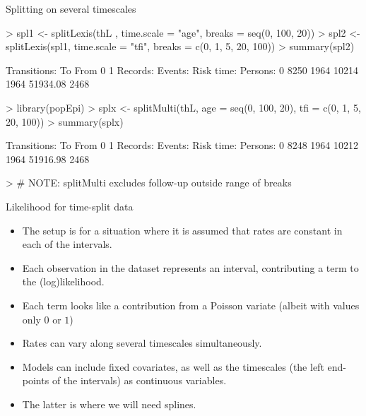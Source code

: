 \begin{frame}[fragile]{Splitting on several timescales}
\vspace*{-1em}
\begin{Schunk}
\begin{Sinput}
> spl1 <- splitLexis(thL , time.scale = "age", breaks = seq(0, 100, 20))
> spl2 <- splitLexis(spl1, time.scale = "tfi", breaks = c(0, 1, 5, 20, 100))
> summary(spl2)
\end{Sinput}
\begin{Soutput}
Transitions:
     To
From    0    1  Records:  Events: Risk time:  Persons:
   0 8250 1964     10214     1964   51934.08      2468
\end{Soutput}
\begin{Sinput}
> library(popEpi)
> splx <- splitMulti(thL, age = seq(0, 100, 20), tfi = c(0, 1, 5, 20, 100))
> summary(splx)
\end{Sinput}
\begin{Soutput}
Transitions:
     To
From    0    1  Records:  Events: Risk time:  Persons:
   0 8248 1964     10212     1964   51916.98      2468
\end{Soutput}
\begin{Sinput}
> # NOTE: splitMulti excludes follow-up outside range of breaks
\end{Sinput}
\end{Schunk}
\end{frame}

\begin{frame}[fragile]{Likelihood for time-split data}
  \begin{itemize}[<+->]
  \item The setup is for a situation where it is assumed that rates are
    constant in each of the intervals.
  \item Each observation in the dataset represents an interval,
    contributing a term to the (log)likelihood.
  \item Each term looks like a contribution from a Poisson variate
    (albeit with values only $0$ or $1$)
  \item Rates can vary along several timescales simultaneously.
  \item Models can include fixed covariates, as well as the timescales
    (the left end-points of the intervals) as continuous variables.
  \item The latter is where we will need splines.
  \end{itemize}
\end{frame}

